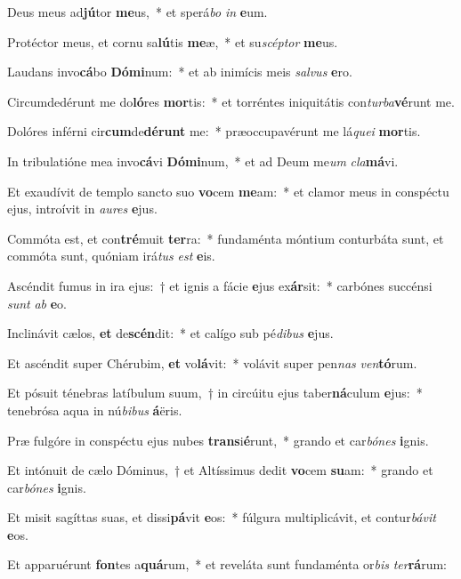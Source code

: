 \item Deus meus ad\textbf{jú}tor \textbf{me}us,~* et sperá\textit{bo} \textit{in} \textbf{e}um.
\item Protéctor meus, et cornu sa\textbf{lú}tis \textbf{me}æ,~* et su\textit{scép}\textit{tor} \textbf{me}us.
\item Laudans invo\textbf{cá}bo \textbf{Dó}\textbf{mi}num:~* et ab inimícis meis \textit{sal}\textit{vus} \textbf{e}ro.
\item Circumdedérunt me do\textbf{ló}res \textbf{mor}tis:~* et torréntes iniquitátis con\textit{tur}\textit{ba}\textbf{vé}runt me.
\item Dolóres inférni cir\textbf{cum}de\textbf{dé}\textbf{runt} me:~* præoccupavérunt me lá\textit{que}\textit{i} \textbf{mor}tis.
\item In tribulatióne mea invo\textbf{cá}vi \textbf{Dó}\textbf{mi}num,~* et ad Deum me\textit{um} \textit{cla}\textbf{má}vi.
\item Et exaudívit de templo sancto suo \textbf{vo}cem \textbf{me}am:~* et clamor meus in conspéctu ejus, introívit in \textit{au}\textit{res} \textbf{e}jus.
\item Commóta est, et con\textbf{tré}muit \textbf{ter}ra:~* fundaménta móntium conturbáta sunt, et commóta sunt, quóniam irá\textit{tus} \textit{est} \textbf{e}is.
\item Ascéndit fumus in ira ejus:~† et ignis a fácie \textbf{e}jus ex\textbf{ár}sit:~* carbónes succénsi \textit{sunt} \textit{ab} \textbf{e}o.
\item Inclinávit cælos, \textbf{et} de\textbf{scén}dit:~* et calígo sub pé\textit{di}\textit{bus} \textbf{e}jus.
\item Et ascéndit super Chérubim, \textbf{et} vo\textbf{lá}vit:~* volávit super pen\textit{nas} \textit{ven}\textbf{tó}rum.
\item Et pósuit ténebras latíbulum suum,~† in circúitu ejus taber\textbf{ná}culum \textbf{e}jus:~* tenebrósa aqua in nú\textit{bi}\textit{bus} \textbf{á}ëris.
\item Præ fulgóre in conspéctu ejus nubes \textbf{trans}i\textbf{é}runt,~* grando et car\textit{bó}\textit{nes} \textbf{i}gnis.
\item Et intónuit de cælo Dóminus,~† et Altíssimus dedit \textbf{vo}cem \textbf{su}am:~* grando et car\textit{bó}\textit{nes} \textbf{i}gnis.
\item Et misit sagíttas suas, et dissi\textbf{pá}vit \textbf{e}os:~* fúlgura multiplicávit, et contur\textit{bá}\textit{vit} \textbf{e}os.
\item Et apparuérunt \textbf{fon}tes a\textbf{quá}rum,~* et reveláta sunt fundaménta or\textit{bis} \textit{ter}\textbf{rá}rum:
